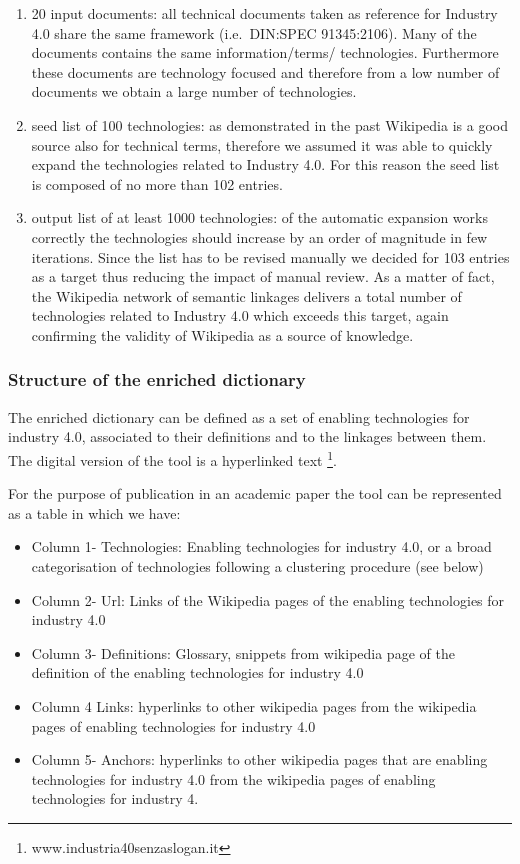 \documentclass[b5paper,]{book}
\providecommand{\tightlist}{%
  \setlength{\itemsep}{0pt}\setlength{\parskip}{0pt}}
\let\rmarkdownfootnote\footnote%
\def\footnote{\protect\rmarkdownfootnote}
\theoremstyle{definition}
\theoremstyle{definition}
\theoremstyle{definition}
\theoremstyle{remark}
\begin{document}
\begin{enumerate}
\def\labelenumi{\arabic{enumi}.}
\item
  20 input documents: all technical documents taken as reference for
  Industry 4.0 share the same framework (i.e.~DIN:SPEC 91345:2106). Many
  of the documents contains the same information/terms/ technologies.
  Furthermore these documents are technology focused and therefore from
  a low number of documents we obtain a large number of technologies.
\item
  seed list of 100 technologies: as demonstrated in the past Wikipedia
  is a good source also for technical terms, therefore we assumed it was
  able to quickly expand the technologies related to Industry 4.0. For
  this reason the seed list is composed of no more than 102 entries.
\item
  output list of at least 1000 technologies: of the automatic expansion
  works correctly the technologies should increase by an order of
  magnitude in few iterations. Since the list has to be revised manually
  we decided for 103 entries as a target thus reducing the impact of
  manual review. As a matter of fact, the Wikipedia network of semantic
  linkages delivers a total number of technologies related to Industry
  4.0 which exceeds this target, again confirming the validity of
  Wikipedia as a source of knowledge.
\end{enumerate}

\subsubsection*{Structure of the enriched
dictionary}\label{structure-of-the-enriched-dictionary}

The enriched dictionary can be defined as a set of enabling technologies
for industry 4.0, associated to their definitions and to the linkages
between them. The digital version of the tool is a hyperlinked text
\footnote{www.industria40senzaslogan.it}.

For the purpose of publication in an academic paper the tool can be
represented as a table in which we have:

\begin{itemize}
\tightlist
\item
  Column 1- Technologies: Enabling technologies for industry 4.0, or a
  broad categorisation of technologies following a clustering procedure
  (see below)
\item
  Column 2- Url: Links of the Wikipedia pages of the enabling
  technologies for industry 4.0
\item
  Column 3- Definitions: Glossary, snippets from wikipedia page of the
  definition of the enabling technologies for industry 4.0
\item
  Column 4 Links: hyperlinks to other wikipedia pages from the wikipedia
  pages of enabling technologies for industry 4.0
\item
  Column 5- Anchors: hyperlinks to other wikipedia pages that are
  enabling technologies for industry 4.0 from the wikipedia pages of
  enabling technologies for industry 4.
\end{itemize}
\end{document}
